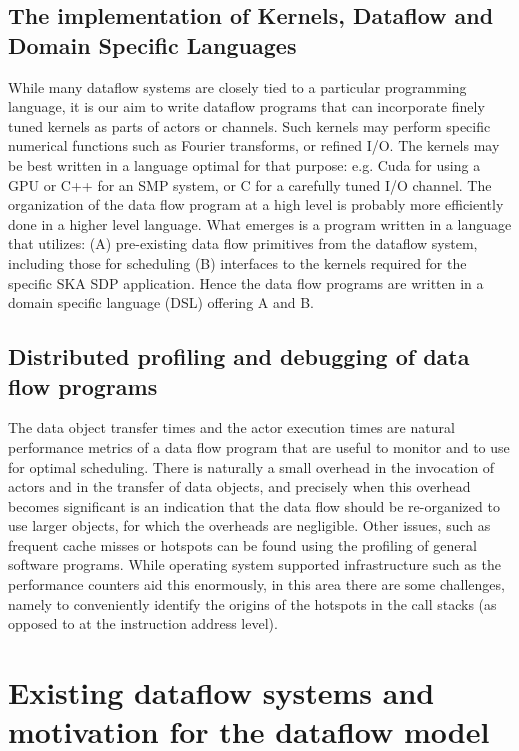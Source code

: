 \documentclass[11pt,a4paper]{article}
\begin{document}
\subsection{The implementation of Kernels, Dataflow and Domain Specific Languages}

While many dataflow systems are closely tied to a particular programming language, it is our aim to write dataflow programs that can incorporate finely tuned kernels as parts of actors or channels.  Such kernels may perform specific numerical functions such as Fourier transforms, or refined I/O. The kernels may be best written in a language optimal for that purpose: e.g. Cuda for using a GPU or C++ for an SMP system, or C for a carefully tuned I/O channel. 
The organization of the data flow program at a high level is probably more efficiently done in a higher level language.
What emerges is a program written in a language that utilizes:
(A) pre-existing data flow primitives from the dataflow system, including those for scheduling
(B) interfaces to the kernels required for the specific SKA SDP application.
Hence the data flow programs are written in a domain specific language (DSL) offering A and B. 

\subsection{Distributed profiling and debugging of data flow programs}

The data object transfer times and the actor execution times are
natural performance metrics of a data flow program that are useful to
monitor and to use for optimal scheduling.  There is naturally a small
overhead in the invocation of actors and in the transfer of data
objects, and precisely when this overhead becomes significant is an
indication that the data flow should be re-organized to use larger
objects, for which the overheads are negligible.  Other issues, such
as frequent cache misses or hotspots can be found using the profiling
of general software programs.  While operating system supported
infrastructure such as the performance counters aid this enormously,
in this area there are some challenges, namely to conveniently
identify the origins of the hotspots in the call stacks (as opposed to
at the instruction address level).

\section{Existing dataflow systems and motivation for the dataflow model}
\label{sec:exist-datafl-syst}
\end{document}
